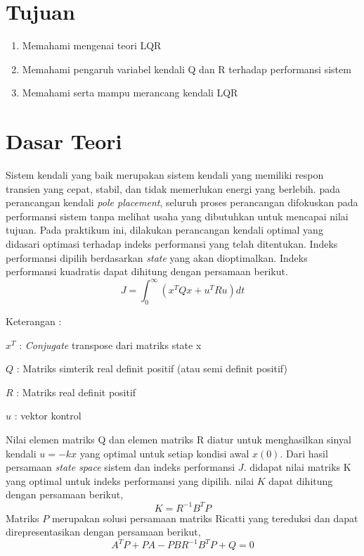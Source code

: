 \documentclass[../main.tex]{subfiles}
\begin{document}
    \section{Tujuan}
        \begin{enumerate}
            \item Memahami mengenai teori LQR
            \item Memahami pengaruh variabel kendali Q dan R terhadap performansi sistem
            \item Memahami serta mampu merancang kendali LQR
        \end{enumerate}
    \section{Dasar Teori}
        Sistem kendali yang baik merupakan sistem kendali yang memiliki respon transien yang cepat, stabil, dan tidak memerlukan energi yang berlebih. pada perancangan kendali \textit{pole placement}, seluruh proses perancangan difokuskan pada performansi sistem tanpa melihat usaha yang dibutuhkan untuk mencapai nilai tujuan. Pada praktikum ini, dilakukan perancangan kendali optimal yang didasari optimasi terhadap indeks performansi yang telah ditentukan. Indeks performansi dipilih berdasarkan \textit{state} yang akan dioptimalkan. Indeks performansi kuadratis dapat dihitung dengan persamaan berikut.
        \begin{equation}
            J = \int_{0}^{\infty}(x^TQx+u^TRu)dt
            \label{persamaan_1}
        \end{equation}
        \begin{center}
            Keterangan :
            \begin{minipage}[c]{13cm}
                \item $x^T$ : \textit{Conjugate} transpose dari matriks state x
                \item $Q$ : Matriks simterik real definit positif (atau semi definit positif)
                \item $R$ : Matriks real definit positif
                \item $u$ : vektor kontrol
            \end{minipage}
        \end{center}
        Nilai elemen matriks Q dan elemen matriks R diatur untuk menghasilkan sinyal kendali $u = -kx$ yang optimal untuk setiap kondisi awal $x(0)$. Dari hasil persamaan \textit{state space} sistem dan indeks performansi $J$. didapat nilai matriks K yang optimal untuk indeks performansi yang dipilih. nilai $K$ dapat dihitung dengan persamaan berikut,
        \begin{equation}
            K = R^{-1}B^TP
            \label{persamaan_2}
        \end{equation}
        Matriks $P$ merupakan solusi persamaan matriks Ricatti yang tereduksi dan dapat direpresentasikan dengan persamaan berikut,
        \begin{equation}
            A^T P+PA-PBR^{-1} B^T P+Q=0
            \label{persamaan_3}
        \end{equation}
\end{document}

